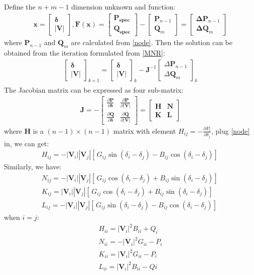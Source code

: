 \documentclass[journal,12pt,onecolumn,draftclsnofoot]{IEEEtran}
\newcommand{\V}{\boldsymbol{V}}
\newcommand{\x}{\boldsymbol{x}}
\newcommand{\icol}[1]{%
  \left[\begin{matrix}#1\end{matrix}\right]%
}
\newcommand{\J}{\boldsymbol{J}}
\newcommand{\F}{\boldsymbol{F}}
\newcommand{\Pb}{\boldsymbol{P}}
\newcommand{\Q}{\boldsymbol{Q}}
\newcommand{\Hb}{\boldsymbol{H}}
\newcommand{\Nb}{\boldsymbol{N}}
\newcommand{\K}{\boldsymbol{K}}
\newcommand{\Lb}{\boldsymbol{L}}
\theoremstyle{definition}
\begin{document}
\begin{enumerate}
Define the $n+m-1$ dimension unknown and function:
\begin{align}
\x = \begin{bmatrix}
\boldsymbol{\delta}\\|\V|
\end{bmatrix}, 
\F(\x) = \icol{\boldsymbol{P_{spec}}\\\boldsymbol{Q_{spec}}}-\icol{\Pb_{n-1}\\\Q_m}=\icol{\boldsymbol{\Delta P}_{n-1}\\\boldsymbol{\Delta Q}_m}
\end{align}
where $\Pb_{n-1}$ and $\Q_m$ are calculated from \eqref{node}. Then the solution can be obtained from the iteration formulated from \eqref{MNR}:
\begin{align}
\begin{bmatrix}
\boldsymbol{\delta}\\|\V|
\end{bmatrix}_{k+1}=
\begin{bmatrix}
\boldsymbol{\delta}\\|\V|
\end{bmatrix}_k-\J^{-1}
\begin{bmatrix}
\Delta \Pb_{n-1}\\ \Delta \Q_m
\end{bmatrix}_k
\end{align}
The Jacobian matrix can be expressed as four sub-matrix:
\begin{align*}
\J = -
\begin{bmatrix}
\frac{\partial \Pb}{\partial \boldsymbol{\delta}} & \frac{\partial \Pb}{\partial |\V|} \\
\frac{\partial \Q}{\partial \boldsymbol{\delta}} & 
\frac{\partial \Q}{\partial |\V|}
\end{bmatrix}=
\begin{bmatrix}
\Hb & \Nb \\ \K & \Lb
\end{bmatrix}
\end{align*}
where $\Hb$ is a $(n-1)\times(n-1)$ matrix with element $H_{ij}=-\frac{\partial P_i}{\partial \delta_j}$, plug \eqref{node} in, we can get:
\begin{align}
H_{ij} = -|\V_i||\V_j|[ \, G_{ij}\sin(\delta_i-\delta_j)-B_{ij}\cos(\delta_i-\delta_j)] \,
\end{align}
Similarly, we have:
\begin{align}
N_{ij} = -|\V_i||\V_j|[ \, G_{ij}\cos(\delta_i-\delta_j)+B_{ij}\sin(\delta_i-\delta_j)] \,\\
K_{ij} = |\V_i||\V_j|[ \, G_{ij}\cos(\delta_i-\delta_j)+B_{ij}\sin(\delta_i-\delta_j)] \,\\
L_{ij} = -|\V_i||\V_j|[ \, G_{ij}\sin(\delta_i-\delta_j)-B_{ij}\cos(\delta_i-\delta_j)] \,
\end{align}
when $i=j$:
\begin{align}
H_{ii} = |\V_i|^2B_{ii}+Q_i\\
N_{ii} = -|\V_i|^2G_{ii}-P_i\\
K_{ii} = |\V_i|^2G_{ii}-P_i\\
L_{ii} = |\V_i|^2B_{ii}-Qi
\end{align}
\end{enumerate}
\end{document}

